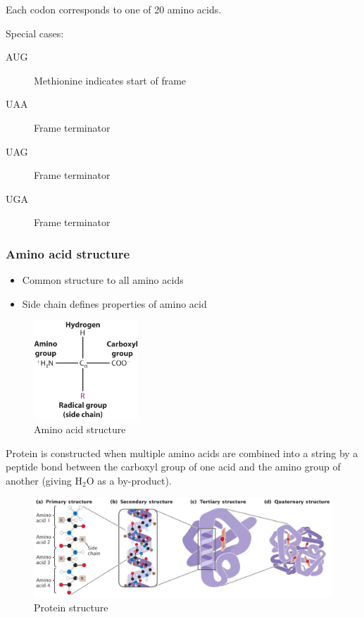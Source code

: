 \documentclass[a4paper]{article}
\begin{document}
Each codon corresponds to one of 20 amino acids.

Special cases:
\begin{description}
  \item[AUG]
    Methionine indicates start of frame
  \item[UAA]
    Frame terminator
  \item[UAG]
    Frame terminator
  \item[UGA]
    Frame terminator
\end{description}

\subsubsection{Amino acid structure}

\begin{itemize}
  \item Common structure to all amino acids
  \item Side chain defines properties of amino acid
\end{itemize}

\begin{figure}[h!]
  \centering
  \includegraphics[width=0.35\textwidth]{graphics/amino_acid_structure.eps}
  \caption{Amino acid structure}
  \label{fig:amino_acid_structure}
\end{figure}
\FloatBarrier

Protein is constructed when multiple amino acids are combined into a string by a
peptide bond between the carboxyl group of one acid and the amino group of
another (giving $\mathrm{H}_{2}\mathrm{O}$ as a by-product).

\begin{figure}[h!]
  \centering
  \includegraphics[width=\textwidth]{graphics/protein_structure.eps}
  \caption{Protein structure}
  \label{fig:protein_structure}
\end{figure}
\FloatBarrier
\end{document}
